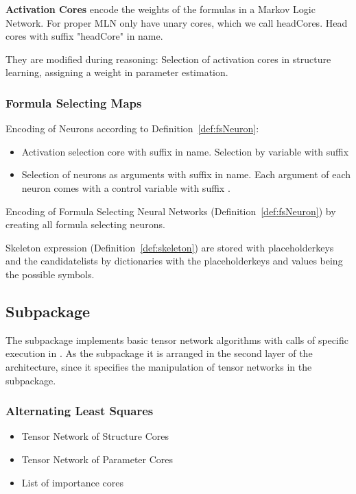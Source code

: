 \textbf{Activation Cores} encode the weights of the formulas in a Markov Logic Network.
For proper MLN only have unary cores, which we call headCores.
Head cores with suffix "headCore" in name.

They are modified during reasoning: Selection of activation cores in structure learning, assigning a weight in parameter estimation.



\subsubsection{Formula Selecting Maps}

Encoding of Neurons according to Definition~\ref{def:fsNeuron}:
\begin{itemize}
	\item Activation selection core with suffix  in name.
		 Selection by variable with suffix 
	\item Selection of neurons as arguments with suffix  in name.
		Each argument of each neuron comes with a control variable with suffix .
\end{itemize}

Encoding of Formula Selecting Neural Networks (Definition~\ref{def:fsNeuron}) by creating all formula selecting neurons.

Skeleton expression (Definition~\ref{def:skeleton}) are stored with placeholderkeys and the candidatelists by dictionaries with the placeholderkeys and values being the possible symbols.



\subsection{Subpackage \spalgorithms}

The \spalgorithms subpackage implements basic tensor network algorithms with calls of specific execution in \spengine.
As the \spencoding subpackage it is arranged in the second layer of the \tnreason architecture, since it specifies the manipulation of tensor networks in the \spengine subpackage.


\subsubsection{Alternating Least Squares}

\begin{itemize}
	\item Tensor Network of Structure Cores
	\item Tensor Network of Parameter Cores
	\item List of importance cores
\end{itemize}

